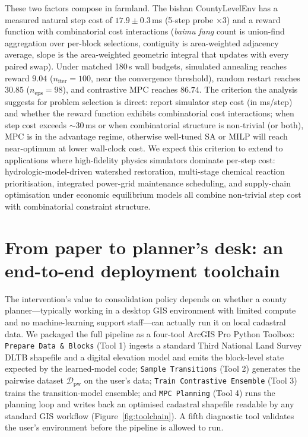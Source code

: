 \documentclass[11pt]{article}
\begin{document}
These two factors compose in farmland. The bishan CountyLevelEnv has a measured natural step cost of $17.9 \pm 0.3$\,ms (5-step probe ×3) and a reward function with combinatorial cost interactions (\textit{baimu fang} count is union-find aggregation over per-block selections, contiguity is area-weighted adjacency average, slope is the area-weighted geometric integral that updates with every paired swap). Under matched 180\,s wall budgets, simulated annealing reaches reward $9.04$ ($n_{\text{iter}}=100$, near the convergence threshold), random restart reaches $30.85$ ($n_{\text{eps}}=98$), and contrastive MPC reaches $86.74$. The criterion the analysis suggests for problem selection is direct: report simulator step cost (in ms/step) and whether the reward function exhibits combinatorial cost interactions; when step cost exceeds $\sim 30$\,ms or when combinatorial structure is non-trivial (or both), MPC is in the advantage regime, otherwise well-tuned SA or MILP will reach near-optimum at lower wall-clock cost. We expect this criterion to extend to applications where high-fidelity physics simulators dominate per-step cost: hydrologic-model-driven watershed restoration, multi-stage chemical reaction prioritisation, integrated power-grid maintenance scheduling, and supply-chain optimisation under economic equilibrium models all combine non-trivial step cost with combinatorial constraint structure.

\section{From paper to planner's desk: an end-to-end deployment toolchain}\label{sec:deploy}

The intervention's value to consolidation policy depends on whether a county planner---typically working in a desktop GIS environment with limited compute and no machine-learning support staff---can actually run it on local cadastral data. We packaged the full pipeline as a four-tool ArcGIS Pro Python Toolbox: \texttt{Prepare Data \& Blocks} (Tool 1) ingests a standard Third National Land Survey DLTB shapefile and a digital elevation model and emits the block-level state expected by the learned-model code; \texttt{Sample Transitions} (Tool 2) generates the pairwise dataset $\mathcal{D}_{\text{pw}}$ on the user's data; \texttt{Train Contrastive Ensemble} (Tool 3) trains the transition-model ensemble; and \texttt{MPC Planning} (Tool 4) runs the planning loop and writes back an optimised cadastral shapefile readable by any standard GIS workflow (Figure~\ref{fig:toolchain}). A fifth diagnostic tool validates the user's environment before the pipeline is allowed to run.
\end{document}
